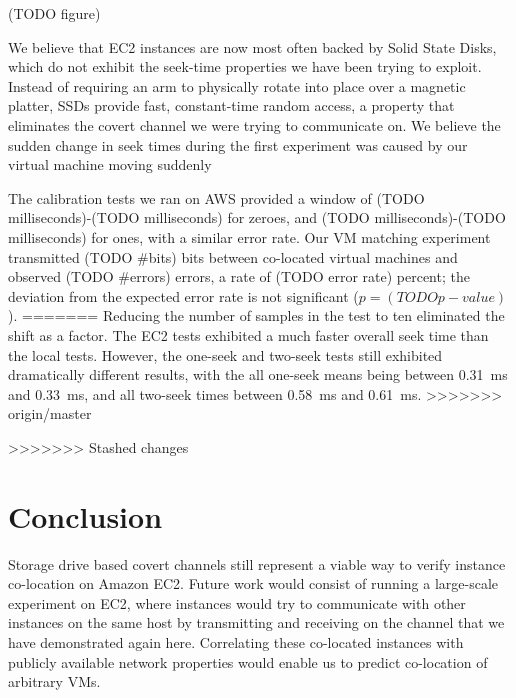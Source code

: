 \documentclass[conference]{IEEEtran}
\begin{document}
(TODO figure)

We believe that EC2 instances are now most often backed by Solid State Disks, which do not exhibit the seek-time
  properties we have been trying to exploit.
Instead of requiring an arm to physically rotate into place over a magnetic platter, SSDs provide fast, constant-time
  random access, a property that eliminates the covert channel we were trying to communicate on.
We believe the sudden change in seek times during the first experiment was caused by our virtual machine moving suddenly

The calibration tests we ran on AWS provided a window of (TODO milliseconds)-(TODO milliseconds) for zeroes, and (TODO
  milliseconds)-(TODO milliseconds) for ones, with a similar error rate.
Our VM matching experiment transmitted (TODO \#bits) bits between co-located virtual machines and observed
  (TODO \#errors) errors, a rate of (TODO error rate) percent; the deviation from the expected error rate is not
  significant ($p = (TODO p-value)$).
=======
Reducing the number of samples in the test to ten eliminated the shift as a factor.
The EC2 tests exhibited a much faster overall seek time than the local tests.
However, the one-seek and two-seek tests still exhibited dramatically different results, with the all one-seek means
  being between \SI{0.31}{ms} and \SI{0.33}{ms}, and all two-seek times between \SI{0.58}{ms} and \SI{0.61}{ms}.
>>>>>>> origin/master

>>>>>>> Stashed changes
\section{Conclusion}
Storage drive based covert channels still represent a viable way to verify instance co-location on Amazon EC2.
Future work would consist of running a large-scale experiment on EC2, where instances would try to communicate with
  other instances on the same host by transmitting and receiving on the channel that we have demonstrated again here.
Correlating these co-located instances with publicly available network properties would enable us to predict
  co-location of arbitrary VMs.



\end{document}
